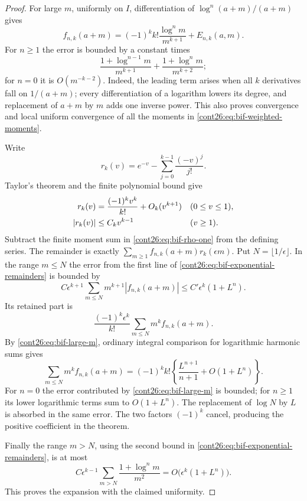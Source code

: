 \documentclass[11pt,letterpaper]{article}
\numberwithin{equation}{section}
\theoremstyle{plain}
\theoremstyle{definition}
\theoremstyle{remark}
\begin{document}
\begin{proof}
For large $m$, uniformly on $I$, differentiation of
$\log^n(a+m)/(a+m)$ gives
\begin{equation}\label{cont26:eq:bif-large-m}
 f_{n,k}(a+m)=(-1)^k k!\frac{\log^n m}{m^{k+1}}+E_{n,k}(a,m).
\end{equation}
For $n\geq1$ the error is bounded by a constant times
\[
 \frac{1+\log^{n-1}m}{m^{k+1}}
       +\frac{1+\log^n m}{m^{k+2}};
\]
for $n=0$ it is $O(m^{-k-2})$. Indeed, the leading term arises when
all $k$ derivatives fall on $1/(a+m)$; every differentiation of a
logarithm lowers its degree, and replacement of $a+m$ by $m$ adds
one inverse power. This also proves convergence and local uniform
convergence of all the moments in \eqref{cont26:eq:bif-weighted-moments}.

Write
\[
 r_k(v)=e^{-v}-\sum_{j=0}^{k-1}\frac{(-v)^j}{j!}.
\]
Taylor's theorem and the finite polynomial bound give
\begin{align}\label{cont26:eq:bif-exponential-remainders}
 r_k(v)&=\frac{(-1)^k v^k}{k!}+O_k(v^{k+1})
                         &&(0\leq v\leq1),\\
 |r_k(v)|&\leq C_k v^{k-1}&&(v\geq1).\notag
\end{align}
Subtract the finite moment sum in \eqref{cont26:eq:bif-rho-one} from the
defining series. The remainder is exactly
$\sum_{m\geq1}f_{n,k}(a+m)r_k(\epsilon m)$.
Put $N=\lfloor1/\epsilon\rfloor$. In the range $m\leq N$ the error
from the first line of \eqref{cont26:eq:bif-exponential-remainders} is bounded by
\[
 C\epsilon^{k+1}\sum_{m\leq N}
                 m^{k+1}|f_{n,k}(a+m)|
   \leq C'\epsilon^k(1+L^n).
\]
Its retained part is
\[
 \frac{(-1)^k\epsilon^k}{k!}
       \sum_{m\leq N}m^k f_{n,k}(a+m).
\]
By \eqref{cont26:eq:bif-large-m}, ordinary integral comparison for logarithmic
harmonic sums gives
\[
 \sum_{m\leq N}m^k f_{n,k}(a+m)
   =(-1)^k k!\left\{\frac{L^{n+1}}{n+1}
                                +O(1+L^n)\right\}.
\]
For $n=0$ the error contributed by \eqref{cont26:eq:bif-large-m} is bounded;
for $n\geq1$ its lower logarithmic terms sum to $O(1+L^n)$.
The replacement of $\log N$ by $L$ is absorbed in the same error.
The two factors $(-1)^k$ cancel, producing the positive coefficient
in the theorem.

Finally the range $m>N$, using the second bound in
\eqref{cont26:eq:bif-exponential-remainders}, is at most
\[
 C\epsilon^{k-1}\sum_{m>N}\frac{1+\log^n m}{m^2}
       =O\bigl(\epsilon^k(1+L^n)\bigr).
\]
This proves the expansion with the claimed uniformity.


\end{proof}
\end{document}
